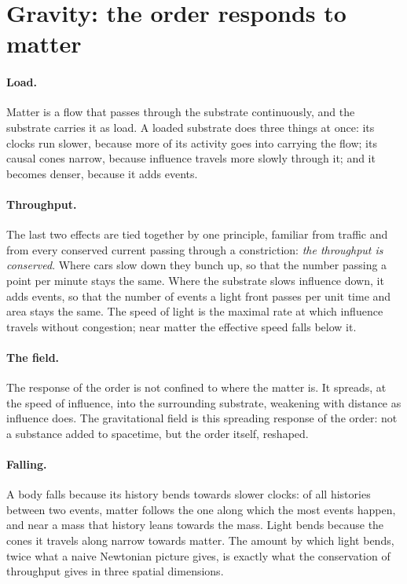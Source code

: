 \section{Gravity: the order responds to matter}\label{sec:onto-gravity}

\paragraph{Load.} Matter is a flow that passes through the substrate continuously, and the substrate
carries it as load. A loaded substrate does three things at once: its clocks run slower, because more
of its activity goes into carrying the flow; its causal cones narrow, because influence travels more
slowly through it; and it becomes denser, because it adds events.

\paragraph{Throughput.} The last two effects are tied together by one principle, familiar from traffic
and from every conserved current passing through a constriction: \emph{the throughput is conserved}.
Where cars slow down they bunch up, so that the number passing a point per minute stays the same.
Where the substrate slows influence down, it adds events, so that the number of events a light front
passes per unit time and area stays the same. The speed of light is the maximal rate at which
influence travels without congestion; near matter the effective speed falls below it.

\paragraph{The field.} The response of the order is not confined to where the matter is. It spreads,
at the speed of influence, into the surrounding substrate, weakening with distance as influence does.
The gravitational field is this spreading response of the order: not a substance added to spacetime,
but the order itself, reshaped. 

\paragraph{Falling.} A body falls because its history bends towards slower clocks: of all histories
between two events, matter follows the one along which the most events happen, and near a mass that
history leans towards the mass. Light bends because the cones it travels along narrow towards
matter. The amount by which light bends, twice what a naive Newtonian picture gives, is exactly what
the conservation of throughput gives in three spatial dimensions. 

